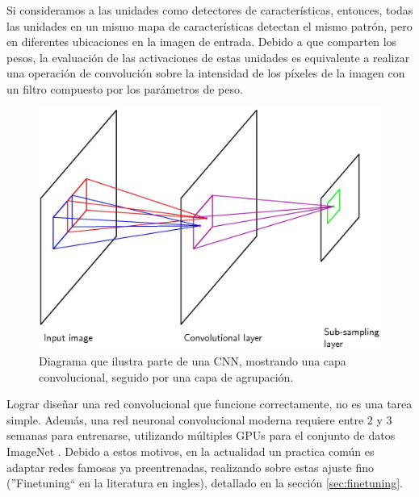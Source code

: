 \documentclass[a4paper,11pt,spanish]{book}
\begin{document}
      Si consideramos a las unidades como detectores de características, entonces, todas las unidades en un mismo mapa de características detectan el mismo patrón,
      pero en diferentes ubicaciones en la imagen de entrada. 
      Debido a que comparten los pesos, la evaluación de las activaciones de estas unidades es equivalente a  realizar una operación de convolución
      sobre la intensidad de los píxeles de la imagen con un filtro compuesto por los parámetros de peso.
      
      \begin{figure}[h]
	\begin{center}
	\includegraphics[width=0.8\linewidth]{./img/bishop_cnn.jpg}
	\end{center}
	\caption{Diagrama que ilustra parte de una CNN, mostrando una capa convolucional, seguido por una capa de agrupación.}
	\label{fig:bishop_cnn}
      \end{figure}
      
      Lograr diseñar una red convolucional que funcione correctamente, no es una tarea simple. Además, una red neuronal convolucional moderna requiere entre 2 y 3 semanas para entrenarse, 
      utilizando múltiples GPUs para el conjunto de datos ImageNet \cite{imagenet_cvpr09}. Debido a estos motivos, en la actualidad un practica común es adaptar
      redes famosas ya preentrenadas, realizando sobre estas ajuste fino (''Finetuning`` en la literatura en ingles), detallado en la sección \ref{sec:finetuning}.

\iffalse
\end{document}
